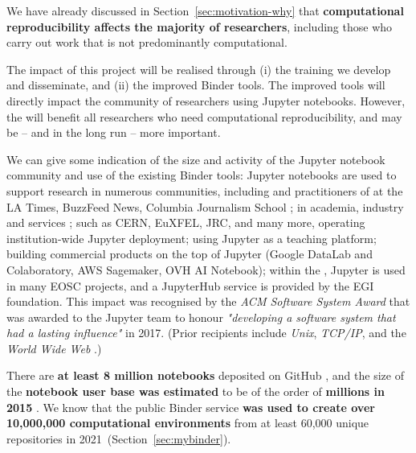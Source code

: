 We have already discussed in Section~\ref{sec:motivation-why} that
\textbf{computational reproducibility affects the majority of researchers},
including those who carry out work that is not predominantly computational.

The impact of this project will be realised through (i) the training we develop
and disseminate, and (ii) the improved Binder tools. The improved tools will
directly impact the community of researchers using Jupyter notebooks. However,
the  will benefit all researchers who need computational reproducibility, and
may be -- and in the long run -- more important.

\medskip

We can give some indication of the size and activity of the Jupyter notebook
community and use of the existing Binder tools: Jupyter notebooks are used to
support research in numerous communities, including
{} and practitioners of  at the LA Times, BuzzFeed News, Columbia Journalism School
\cite{latimes-datadesk} \cite{columbia-nytimes} \cite{data-journalism};
 in academia, industry and services \cite{Perkel2018};
{} such as CERN, EuXFEL, JRC, and many more,
operating institution-wide Jupyter deployment;
{} using Jupyter as a teaching platform;
{} building commercial products on the
top of Jupyter (Google DataLab and Colaboratory, AWS Sagemaker, OVH AI Notebook);
within the , Jupyter is used in many EOSC
projects, and a JupyterHub service is provided by the EGI foundation.
This impact was recognised by the \emph{ACM Software System Award} that was
awarded to the Jupyter team to honour \emph{"developing a software system that
had a lasting influence"} in 2017. (Prior recipients include \emph{Unix},
\emph{TCP/IP}, and the \emph{World Wide Web} \cite{acm-award}.)

There are \textbf{at least 8 million notebooks} deposited on GitHub \cite{notebookcount}, and
the size of the \textbf{notebook user base was estimated} to be of the order of
\textbf{millions in 2015} \cite{jupyter-grant}. We know that the public Binder service \textbf{\mybinder{}
was used to create over 10,000,000 computational environments}
from at least 60,000 unique repositories in 2021~(Section~\ref{sec:mybinder}).


